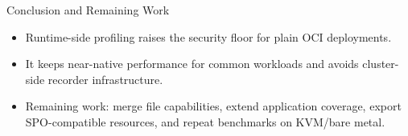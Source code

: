 \documentclass[aspectratio=169]{beamer}
\begin{document}
\begin{frame}{Conclusion and Remaining Work}
  \begin{itemize}
    \item Runtime-side profiling raises the security floor for plain OCI deployments.
    \item It keeps near-native performance for common workloads and avoids cluster-side recorder infrastructure.
    \item Remaining work: merge file capabilities, extend application coverage, export SPO-compatible resources, and repeat benchmarks on KVM/bare metal.
  \end{itemize}
\end{frame}
\end{document}

